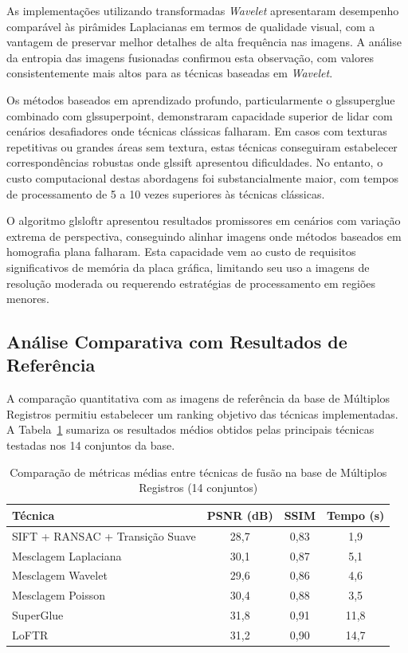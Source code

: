 As implementações utilizando transformadas \textit{Wavelet} apresentaram desempenho comparável às pirâmides Laplacianas em termos de qualidade visual, com a vantagem de preservar melhor detalhes de alta frequência nas imagens. A análise da entropia das imagens fusionadas confirmou esta observação, com valores consistentemente mais altos para as técnicas baseadas em \textit{Wavelet}.

Os métodos baseados em aprendizado profundo, particularmente o gls{superglue} combinado com gls{superpoint}, demonstraram capacidade superior de lidar com cenários desafiadores onde técnicas clássicas falharam. Em casos com texturas repetitivas ou grandes áreas sem textura, estas técnicas conseguiram estabelecer correspondências robustas onde gls{sift} apresentou dificuldades. No entanto, o custo computacional destas abordagens foi substancialmente maior, com tempos de processamento de 5 a 10 vezes superiores às técnicas clássicas.

O algoritmo gls{loftr} apresentou resultados promissores em cenários com variação extrema de perspectiva, conseguindo alinhar imagens onde métodos baseados em homografia plana falharam. Esta capacidade vem ao custo de requisitos significativos de memória da placa gráfica, limitando seu uso a imagens de resolução moderada ou requerendo estratégias de processamento em regiões menores.

\subsection{Análise Comparativa com Resultados de Referência}

A comparação quantitativa com as imagens de referência da base de Múltiplos Registros permitiu estabelecer um ranking objetivo das técnicas implementadas. A Tabela~\ref{tab:ranking_tecnicas} sumariza os resultados médios obtidos pelas principais técnicas testadas nos 14 conjuntos da base.

\begin{table}[htb]
\centering
\caption{Comparação de métricas médias entre técnicas de fusão na base de Múltiplos Registros (14 conjuntos)}
\label{tab:ranking_tecnicas}
\begin{tabular}{lccc}
\hline
\textbf{Técnica} & \textbf{PSNR (dB)} & \textbf{SSIM} & \textbf{Tempo (s)} \\
\hline
SIFT + RANSAC + Transição Suave & 28,7 & 0,83 & 1,9 \\
Mesclagem Laplaciana & 30,1 & 0,87 & 5,1 \\
Mesclagem Wavelet & 29,6 & 0,86 & 4,6 \\
Mesclagem Poisson & 30,4 & 0,88 & 3,5 \\
SuperGlue & 31,8 & 0,91 & 11,8 \\
LoFTR & 31,2 & 0,90 & 14,7 \\
\hline
\end{tabular}
\end{table}

